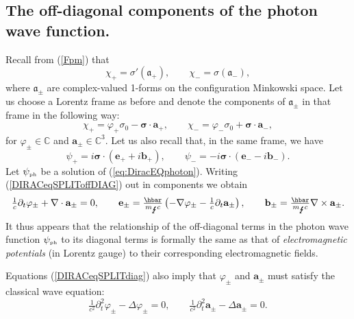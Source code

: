 \documentclass[12pt]{article}
\theoremstyle{definition}
\newcommand{\refeq}[1]{(\ref{#1})}
\numberwithin{equation}{section}
\newcommand{\fa}{\mathfrak{a}}
\newcommand{\bb}{\mathbf{b}}
\newcommand{\ba}{\mathbf{a}}
\newcommand{\bfa}{\boldsymbol{\fa}}
\newcommand{\be}{\mathbf{e}}
\newcommand{\beq}{\begin{equation}}
\newcommand{\eeq}{\end{equation}}
\newcommand{\p}{\partial}
\newcommand{\siV}{\boldsymbol{\sigma}}
\newcommand{\psiPH}{{\psi_{\mbox{\rm\tiny ph}}}}
\newcommand{\mPH}{{m_{\mbox{\Lightning}}}}
\newcommand{\Cset}{{\mathbb C}}
\newcommand{\si}{\sigma}
\newcommand{\nab}{\nabla}
\begin{document}
\subsection{The off-diagonal components of the photon wave function.}\label{sec:offdiag}
 Recall from \refeq{Fpm} that 
\beq
\chi_+ = \si'(\bfa_+),\qquad \chi_- = \si(\bfa_-),
\eeq
where $\bfa_\pm$ are complex-valued 1-forms on the configuration Minkowski space. 
 Let us choose a Lorentz frame as before and denote the components of $\bfa_\pm$ in that frame in the following way:
\beq\label{eq:insidechi}
\chi_+ = \varphi_+\si_0 - \siV \cdot \ba_+,\qquad \chi_- = \varphi_- \si_0 + \siV \cdot \ba_-,
\eeq
 for $\varphi_\pm \in \Cset$ and $\ba_\pm \in \Cset^3$. 
 Let us also recall that, in the same frame, we have
\beq\label{eq:insidepsi}
\psi_+ = i \siV \cdot (\be_+ + i \bb_+),\qquad \psi_- = - i \siV \cdot (\be_- - i \bb_-).
\eeq
  Let $\psiPH$ be a solution of \refeq{eq:DiracEQphoton}. 
 Writing \refeq{DIRACeqSPLIToffDIAG} out in components we obtain
\beq\label{eq:potentials}
\tfrac{1}{c}\p_t \varphi_\pm + \nab \cdot \ba_\pm = 0,
\qquad  
\be_\pm = \tfrac{\hbar}{\mPH c} \left(-\nab \varphi_\pm - \tfrac{1}{c}\p_t \ba_\pm\right),
\qquad 
\bb_\pm = \tfrac{\hbar}{\mPH c} \nab\times \ba_\pm.
\eeq
It thus appears that the relationship of the off-diagonal terms in the photon wave function 
 $\psiPH$ to its diagonal terms is formally the same as that of {\em electromagnetic potentials} 
(in Lorentz gauge) to their corresponding electromagnetic fields.  

Equations \refeq{DIRACeqSPLITdiag} also imply that $\varphi_\pm$ and $\ba_\pm$ must satisfy the classical wave equation: 
\beq\label{eq:waves}
\tfrac{1}{c^2} \p_t^2 \varphi_\pm - \Delta \varphi_\pm = 0,\qquad \tfrac{1}{c^2} \p_t^2 \ba_\pm - \Delta \ba_\pm = 0.
\eeq
\end{document}
